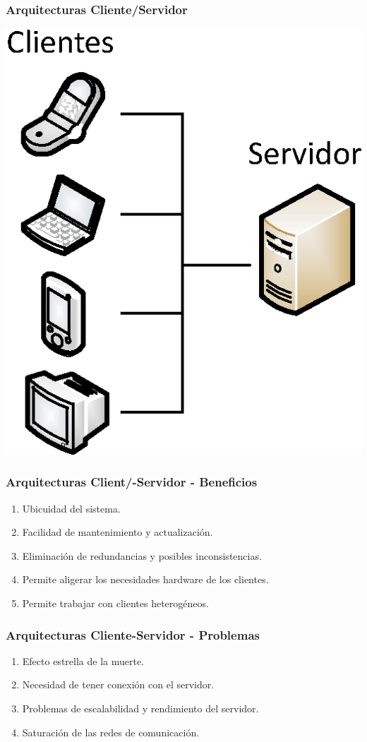 \documentclass[a4paper,t,xcolor=pst,dvips,colortheme]{beamer}
\begin{document}
\begin{frame}[c]
	\frametitle{Arquitecturas Cliente/Servidor}
	\begin{center}
        \includegraphics[width=.5\linewidth,keepaspectratio=true]{images/patterns/clienteServidor.eps}
	\end{center}
\end{frame}

\begin{frame}[c]
    \frametitle{Arquitecturas Client/-Servidor - Beneficios}
    \begin{enumerate}[<+->]
        \item Ubicuidad del sistema.
        \item Facilidad de mantenimiento y actualización.
        \item Eliminación de redundancias y posibles inconsistencias.
        \item Permite aligerar los necesidades hardware de los clientes.
        \item Permite trabajar con clientes heterogéneos.
    \end{enumerate}
\end{frame}

\begin{frame}[c]
    \frametitle{Arquitecturas Cliente-Servidor - Problemas}
    \begin{enumerate}[<+->]
        \item Efecto estrella de la muerte.
        \item Necesidad de tener conexión con el servidor.
        \item Problemas de escalabilidad y rendimiento del servidor.
        \item Saturación de las redes de comunicación.
    \end{enumerate}
\end{frame}
\end{document}
